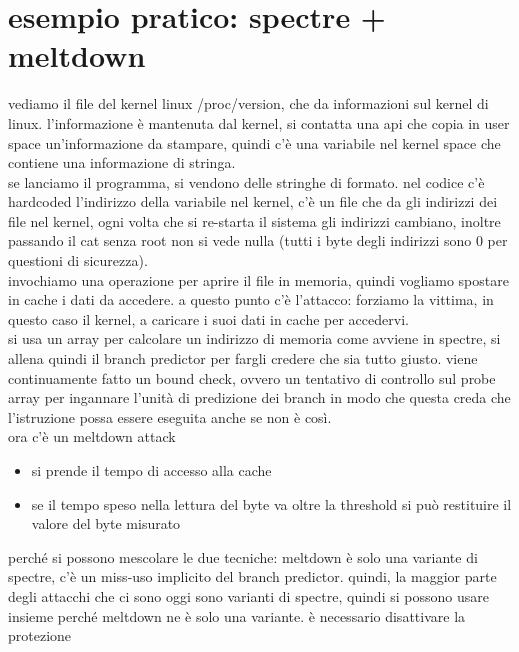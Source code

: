 \documentclass[12pt, oneside]{extbook} %
\begin{document}
\section*{esempio pratico: spectre + meltdown}
vediamo il file del kernel linux \textsf{/proc/version}, che da informazioni sul kernel di linux. l'informazione è mantenuta dal kernel, si contatta una api che copia in user space un'informazione da stampare, quindi c'è una variabile nel kernel space che contiene una informazione di stringa.\\se lanciamo il programma, si vendono delle stringhe di formato. nel codice c'è hardcoded l'indirizzo della variabile nel kernel, c'è un file che da gli indirizzi dei file nel kernel, ogni volta che si re-starta il sistema gli indirizzi cambiano, inoltre passando il cat senza root non si vede nulla (tutti i byte degli indirizzi sono 0 per questioni di sicurezza).\\ invochiamo una operazione per aprire il file in memoria, quindi vogliamo spostare in cache i dati da accedere. a questo punto c'è l'attacco: forziamo la vittima, in questo caso il kernel, a caricare i suoi dati in cache per accedervi.\\si usa un array per calcolare un indirizzo di memoria come avviene in spectre, si allena quindi il branch predictor per fargli credere che sia tutto giusto. viene continuamente fatto un bound check, ovvero un tentativo di controllo sul probe array per ingannare l'unità di predizione dei branch in modo che questa creda che l'istruzione possa essere eseguita anche se non è così.\\ora c'è un meltdown attack
\begin{itemize}
\item si prende il tempo di accesso alla cache
\item se il tempo speso nella lettura del byte va oltre la threshold si può restituire il valore del byte misurato
\end{itemize}
perché si possono mescolare le due tecniche: meltdown è solo una variante di spectre, c'è un miss-uso implicito del branch predictor. quindi, la maggior parte degli attacchi che ci sono oggi sono varianti di spectre, quindi si possono usare insieme perché meltdown ne è solo una variante. è necessario disattivare la protezione
\end{document}

